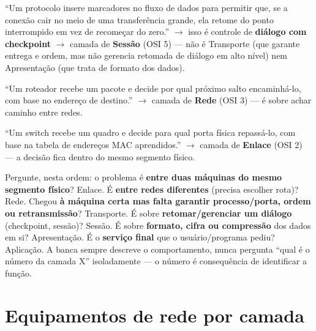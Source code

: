 \begin{exemplo}
“Um protocolo insere marcadores no fluxo de dados para permitir que, se a
conexão cair no meio de uma transferência grande, ela retome do ponto
interrompido em vez de recomeçar do zero.” $\to$ isso é controle de
\textbf{diálogo com checkpoint} $\to$ camada de \textbf{Sessão} (OSI 5) ---
não é Transporte (que garante entrega e ordem, mas não gerencia retomada de
diálogo em alto nível) nem Apresentação (que trata de formato dos dados).

“Um roteador recebe um pacote e decide por qual próximo salto encaminhá-lo,
com base no endereço de destino.” $\to$ camada de \textbf{Rede} (OSI 3) ---
é sobre achar caminho entre redes.

“Um switch recebe um quadro e decide para qual porta física repassá-lo, com
base na tabela de endereços MAC aprendidos.” $\to$ camada de \textbf{Enlace}
(OSI 2) --- a decisão fica dentro do mesmo segmento físico.
\end{exemplo}

\begin{regrapratica}
Pergunte, nesta ordem: o problema é \textbf{entre duas máquinas do mesmo
segmento físico}? Enlace. É \textbf{entre redes diferentes} (precisa
escolher rota)? Rede. Chegou \textbf{à máquina certa mas falta garantir
processo/porta, ordem ou retransmissão}? Transporte. É sobre
\textbf{retomar/gerenciar um diálogo} (checkpoint, sessão)? Sessão. É sobre
\textbf{formato, cifra ou compressão} dos dados em si? Apresentação. É o
\textbf{serviço final} que o usuário/programa pediu? Aplicação. A banca
sempre descreve o comportamento, nunca pergunta “qual é o número da camada
X” isoladamente --- o número é consequência de identificar a função.
\end{regrapratica}

\section{Equipamentos de rede por camada}


